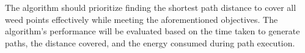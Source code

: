 The algorithm should prioritize finding the shortest path distance to cover all weed points effectively while meeting the aforementioned objectives. The algorithm's performance will be evaluated based on the time taken to generate paths, the distance covered, and the energy consumed during path execution.

\vspace*{6mm} 

